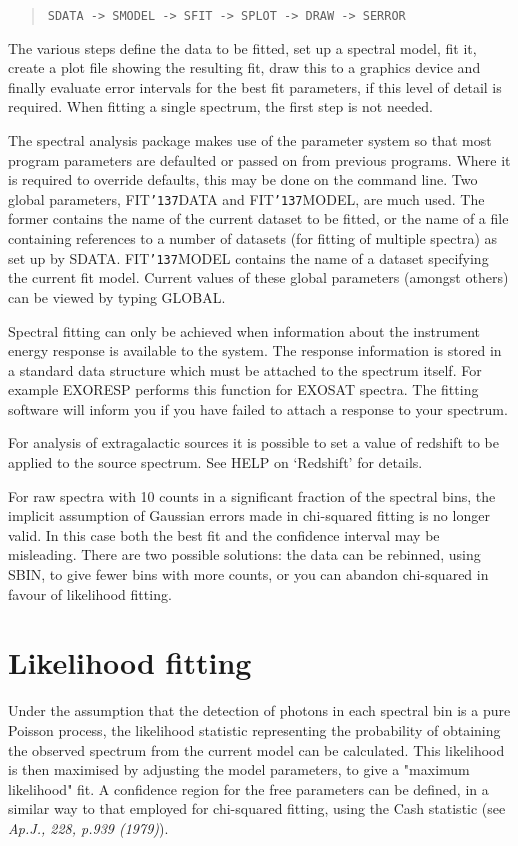 \documentclass{book}
\renewcommand{\_}{{\tt\char'137}}     %
\begin{document}
\begin{quote}\begin{verbatim}
SDATA -> SMODEL -> SFIT -> SPLOT -> DRAW -> SERROR
\end{verbatim}\end{quote}
The various steps define the data to be fitted, set up a spectral
model, fit it, create a plot file showing the resulting fit, draw
this to a graphics device and finally evaluate error intervals for
the best fit parameters, if this level of detail is required.
When fitting a single spectrum, the first step is not needed.

The spectral analysis package makes use of the parameter system
so that most program parameters are defaulted or passed on from
previous programs. Where it is required to override defaults,
this may be done on the command line. Two global parameters,
FIT\_DATA and FIT\_MODEL, are much used. The former contains the
name of the current dataset to be fitted, or the name of a file
containing references to a number of datasets (for fitting of
multiple spectra) as set up by SDATA. FIT\_MODEL contains the name
of a dataset specifying the current fit model. Current values of
these global parameters (amongst others) can be viewed by typing
GLOBAL.

Spectral fitting can only be achieved when information about the
instrument energy response is available to the system. The
response information is stored in a standard data structure which
must be attached to the spectrum itself. For example EXORESP performs
this function for EXOSAT spectra. The fitting software will
inform you if you have failed to attach a response to your spectrum.

For analysis of extragalactic sources it is possible to set a
value of redshift to be applied to the source spectrum. See HELP
on `Redshift' for details.

For raw spectra with 10 counts in a significant fraction of the spectral
bins, the implicit assumption of Gaussian errors made in chi-squared
fitting is no longer valid. In this case both the best fit and the
confidence interval may be misleading. There are two possible solutions:
the data can be rebinned, using SBIN, to give fewer bins with more
counts, or you can abandon chi-squared in favour of
likelihood fitting.

\section{Likelihood fitting}
Under the assumption that the detection of photons in each spectral
bin is a pure Poisson process, the likelihood statistic representing
the probability of obtaining the observed spectrum from the current
model can be calculated. This likelihood is then maximised by adjusting
the model parameters, to give a "maximum likelihood" fit. A confidence
region for the free parameters can be defined, in a similar way to
that employed for chi-squared fitting, using the Cash statistic
(see {\em Ap.J., 228, p.939 (1979)}).
\end{document}
